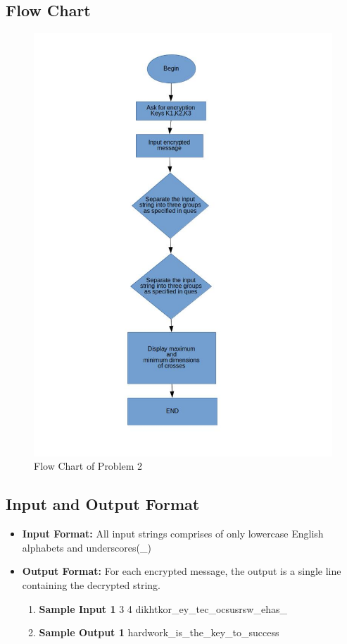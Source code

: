 \documentclass[12pt]{article}
\begin{document}
		\subsection{Flow Chart}
			\begin{figure}[h!]
				\centering
				\caption{Flow Chart of Problem 2}
				\includegraphics[scale=.6]{ps2_f_1.jpg}
			\end{figure}
		
		\subsection{Input and Output Format}
			\begin{itemize}
				\item \textbf{Input Format:} All input strings comprises of only lowercase English alphabets and underscores(\_) 
				\item  \textbf{Output Format:} For each encrypted message, the output is a single line containing the decrypted string.
				\begin{enumerate}
					\item \textbf{Sample Input 1}
					 3 4
					\subitem dikhtkor\_ey\_tec\_ocsusrsw\_ehas\_
					\item \textbf{Sample Output 1}
					\subitem hardwork\_is\_the\_key\_to\_success
					
				\end{enumerate}
			\end{itemize}
		
\end{document}
